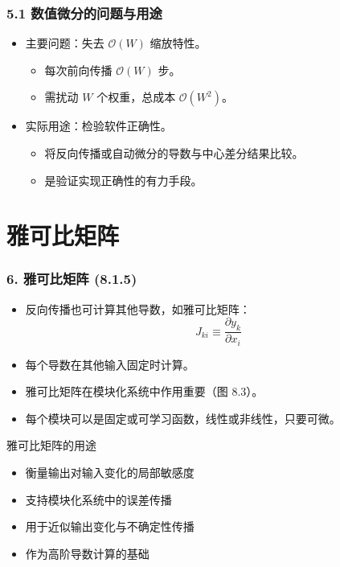 \documentclass[t,aspectratio=169]{beamer} %
\begin{document}
\begin{frame}
    \frametitle{5.1 数值微分的问题与用途}
    \begin{itemize}
        \item \alert{主要问题}：失去 $\mathcal{O}(W)$ 缩放特性。
        \begin{itemize}
            \item 每次前向传播 $\mathcal{O}(W)$ 步。
            \item 需扰动 $W$ 个权重，总成本 $\mathcal{O}(W^2)$。
        \end{itemize}
        \item \alert{实际用途}：检验软件正确性。
        \begin{itemize}
            \item 将反向传播或自动微分的导数与\alert{中心差分}结果比较。
            \item 是验证实现正确性的有力手段。
        \end{itemize}
    \end{itemize}
\end{frame}

\section{雅可比矩阵}

\begin{frame}
    \frametitle{6. 雅可比矩阵 (8.1.5)}
    \begin{itemize}
        \item 反向传播也可计算其他导数，如\alert{雅可比矩阵}：
        \begin{equation}
            J_{ki} \equiv \frac{\partial y_k}{\partial x_i}
            \tag{8.26}
        \end{equation}
        \item 每个导数在其他输入固定时计算。
        \item 雅可比矩阵在\alert{模块化系统}中作用重要（图 8.3）。
        \item 每个模块可以是固定或可学习函数，线性或非线性，只要\alert{可微}。
    \end{itemize}
    \begin{block}{雅可比矩阵的用途}
        \begin{itemize}
            \item 衡量输出对输入变化的\alert{局部敏感度}
            \item 支持\alert{模块化系统中的误差传播}
            \item 用于近似输出变化与\alert{不确定性传播}
            \item 作为\alert{高阶导数计算}的基础
        \end{itemize}
    \end{block}
\end{frame}
\end{document}
